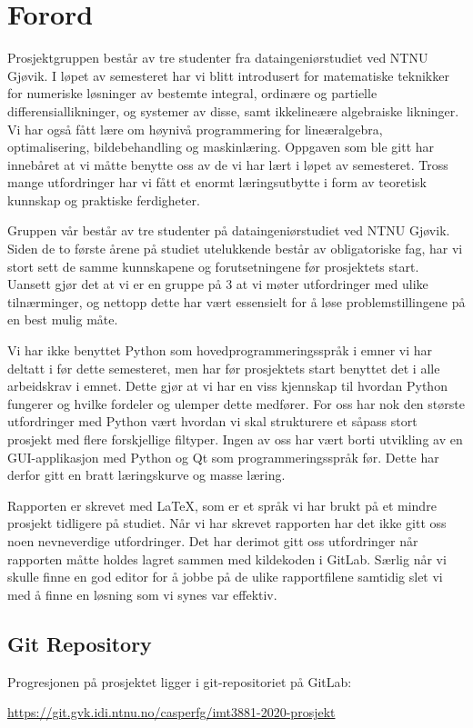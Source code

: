 \section{Forord}
Prosjektgruppen består av tre studenter fra dataingeniørstudiet ved NTNU Gjøvik. I løpet av 
semesteret har vi blitt introdusert for matematiske teknikker for numeriske løsninger av bestemte 
integral, ordinære og partielle differensiallikninger, og systemer av disse, samt ikkelineære algebraiske likninger. Vi har også fått lære om høynivå programmering for lineæralgebra, optimalisering, bildebehandling 
og maskinlæring. Oppgaven som ble gitt har innebåret at vi måtte benytte oss av de vi har lært i løpet
av semesteret. Tross mange utfordringer har vi fått et enormt læringsutbytte i form av teoretisk kunnskap og praktiske ferdigheter.

Gruppen vår består av tre studenter på dataingeniørstudiet ved NTNU Gjøvik. Siden de to første årene på studiet utelukkende består av obligatoriske fag, har vi stort sett de samme kunnskapene og forutsetningene før prosjektets start. Uansett gjør det at vi er en gruppe på 3 at vi møter utfordringer med ulike tilnærminger, og nettopp dette har vært essensielt for å løse problemstillingene på en best mulig måte.

Vi har ikke benyttet Python som hovedprogrammeringsspråk i emner vi har deltatt i før dette semesteret, men har før prosjektets start benyttet det i alle arbeidskrav i emnet. Dette gjør at vi har en viss kjennskap til hvordan Python fungerer og hvilke fordeler og ulemper dette medfører. For oss har nok den største utfordringer med Python vært hvordan vi skal strukturere et såpass stort prosjekt med flere forskjellige filtyper. Ingen av oss har vært borti utvikling av en GUI-applikasjon med Python og Qt som programmeringsspråk før. Dette har derfor gitt en bratt læringskurve og masse læring.

Rapporten er skrevet med LaTeX, som er et språk vi har brukt på et mindre prosjekt tidligere på studiet. Når vi har skrevet rapporten har det ikke gitt oss noen nevneverdige utfordringer. Det har derimot gitt oss utfordringer når rapporten måtte holdes lagret sammen med kildekoden i GitLab. Særlig når vi skulle finne en god editor for å jobbe på de ulike rapportfilene samtidig slet vi med å finne en løsning som vi synes var effektiv.

\subsection{Git Repository}
Progresjonen på prosjektet ligger i git-repositoriet på GitLab:

\url{https://git.gvk.idi.ntnu.no/casperfg/imt3881-2020-prosjekt}